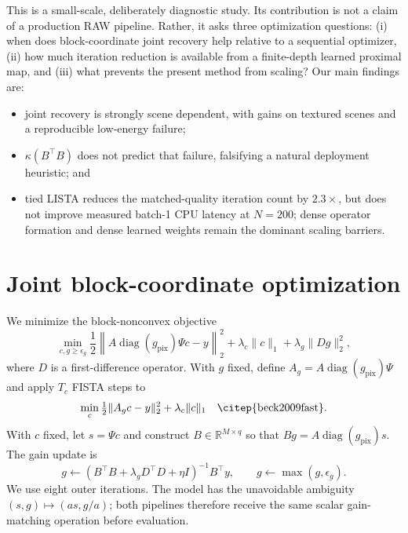 \documentclass[anon]{opt2026}
\begin{document}
This is a small-scale, deliberately diagnostic study.  Its contribution is
not a claim of a production RAW pipeline.  Rather, it asks three optimization
questions: (i) when does block-coordinate joint recovery help relative to a
sequential optimizer, (ii) how much iteration reduction is available from a
finite-depth learned proximal map, and (iii) what prevents the present method
from scaling?  Our main findings are:
\begin{itemize}[leftmargin=*,nosep]
  \item joint recovery is strongly scene dependent, with gains on textured
  scenes and a reproducible low-energy failure;
  \item $\kappa(B^\top B)$ does not predict that failure, falsifying a natural
  deployment heuristic; and
  \item tied LISTA reduces the matched-quality iteration count by $2.3\times$,
  but does not improve measured batch-1 CPU latency at $N=200$; dense operator
  formation and dense learned weights remain the dominant scaling barriers.
\end{itemize}

\section{Joint block-coordinate optimization}

We minimize the block-nonconvex objective
\begin{equation}
 \min_{c,g\geq \epsilon_g}
 \frac12\left\|A\operatorname{diag}(g_{\mathrm{pix}})\Psi c-y\right\|_2^2
 +\lambda_c\|c\|_1+\lambda_g\|Dg\|_2^2,
 \label{eq:joint}
\end{equation}
where $D$ is a first-difference operator.  With $g$ fixed, define
$A_g=A\operatorname{diag}(g_{\mathrm{pix}})\Psi$ and apply $T_c$ FISTA steps to
\begin{equation}
  \min_c \tfrac12\|A_gc-y\|_2^2+\lambda_c\|c\|_1
  \quad\text{\citep{beck2009fast}.}
\end{equation}
With $c$ fixed, let $s=\Psi c$ and construct $B\in\mathbb{R}^{M\times q}$ so
that $Bg=A\operatorname{diag}(g_{\mathrm{pix}})s$.  The gain update is
\begin{equation}
  g\leftarrow(B^\top B+\lambda_gD^\top D+\eta I)^{-1}B^\top y,
  \qquad g\leftarrow\max(g,\epsilon_g).
  \label{eq:gupdate}
\end{equation}
We use eight outer iterations.  The model has the unavoidable ambiguity
$(s,g)\mapsto(as,g/a)$; both pipelines therefore receive the same scalar
gain-matching operation before evaluation.
\end{document}

